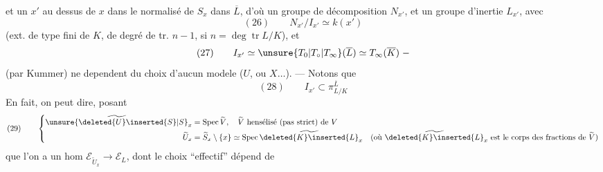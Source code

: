 et un $x'$ au dessus de $x$ dans le normalisé de $S_x$ dans $\overline L$, d'où un groupe de décomposition $N_{x'}$, et un groupe d'inertie $L_{x'}$, avec
\[
(26)\qquad N_{x'}/I_{x'}\simeq k(x')
\]
(ext. de type fini de $K$, de degré de tr. $n-1$, si $n=\deg\operatorname{tr}L/K$), et
\[
(27)\qquad I_{x'}\simeq\unsure{T_0|T_\circ|T_\infty}(\overline L)\simeq T_\infty(\overline K)\;-
\]
(par Kummer)   ne dependent du choix d'aucun  modele ($U$, ou $X\ldots$). --- Notons que
\[
(28)\qquad I_{x'}\subset\pi_{L/K}^{\overline L}
\]
En fait, on peut dire, posant
\[
(29)\qquad\left\{\begin{aligned}
\widetilde{\unsure{\deleted{U}\inserted{S}|S}}_x&=\operatorname{Spec}\widetilde V,\quad\widetilde V\text{ hensélisé (pas strict) de }V\\
\widetilde U_x&=\widetilde S_x\setminus\{x\}\simeq\operatorname{Spec}\widetilde{\deleted{K}\inserted{L}}_x\quad(\text{où }\widetilde{\deleted{K}\inserted{L}}_x\text{ est le corps des fractions de }\widetilde V)
\end{aligned}\right.
\]
que l'on a un hom  $\mathcal E_{\widetilde U_x}\longrightarrow\mathcal E_L$,  dont le choix ``effectif'' dépend de
